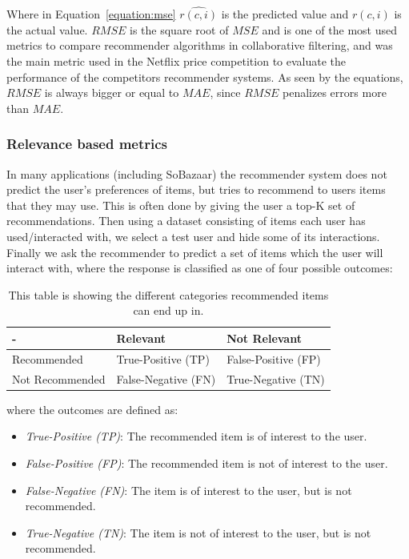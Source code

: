 Where in Equation~\ref{equation:mse} $\hat{r(c,i)}$ is the predicted value and
$r(c,i)$ is the actual value. $RMSE$ is the square root of $MSE$ and is one of
the most used metrics to compare recommender algorithms in collaborative
filtering, and was the main metric used in the Netflix price competition to
evaluate the performance of the competitors recommender systems. As seen by the
equations, $RMSE$ is always bigger or equal to $MAE$, since $RMSE$ penalizes
errors more than $MAE$.

\subsubsection{Relevance based metrics}

In many applications (including SoBazaar) the recommender system does not
predict the user's preferences of items, but tries to recommend to users items
that they may use. This is often done by giving the user a top-K set of
recommendations. Then using a dataset consisting of items each user has
used/interacted with, we select a test user and hide some of its interactions.
Finally we ask the recommender to predict a set of items which the user will
interact with, where the response is classified as one of four possible
outcomes:

\begin{table}[H]
	\centering
	\begin{tabular}{lll}
	\toprule
	-								&	Relevant						&	Not Relevant 				\\
	\midrule
	Recommended			&	True-Positive (TP) 	&	False-Positive (FP)	\\
	Not Recommended	&	False-Negative (FN)	&	True-Negative (TN)	\\
	\bottomrule
	\end{tabular}
	\label{table:usageprediction}
	\caption[Usage prediction (Confusion Matrix)]{This table is showing the different categories recommended items can end up in.}
\end{table}

\noindent
where the outcomes are defined as:

\begin{itemize}
	\item \textit{True-Positive (TP)}: The recommended item is of interest to the
	user.
	\item \textit{False-Positive (FP)}: The recommended item is not of interest to
	the user.
	\item \textit{False-Negative (FN)}: The item is of interest to the user, but is
	not recommended.
	\item \textit{True-Negative (TN)}: The item is not of interest to the user, but
	is not recommended.
\end{itemize}

